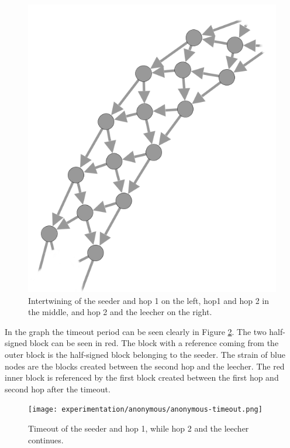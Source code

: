 \begin{figure}
	\centerline{\includegraphics[scale=0.5]{experimentation/anonymous/anonymous-magnified.png}}
	\caption{Intertwining of the seeder and hop 1 on the left, hop1 and hop 2 in the middle, and hop 2 and the leecher on the right.}
	\label{fig:synthetic-anonymous-graph-magnified}
\end{figure}

In the graph the timeout period can be seen clearly in Figure \ref{fig:synthetic-anonymous-timeout}.
The two half-signed block can be seen in red.
The block with a reference coming from the outer block is the half-signed block belonging to the seeder.
The strain of blue nodes are the blocks created between the second hop and the leecher.
The red inner block is referenced by the first block created between the first hop and second hop after the timeout.

\begin{figure}
	\centerline{\texttt{[image: experimentation/anonymous/anonymous-timeout.png]}}
	\caption{Timeout of the seeder and hop 1, while hop 2 and the leecher continues.}
	\label{fig:synthetic-anonymous-timeout}
\end{figure}

